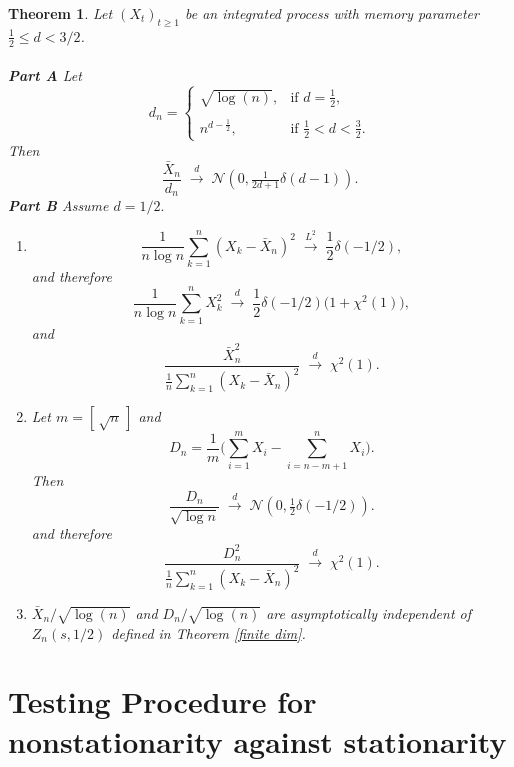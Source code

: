 \documentclass[12pt]{article}
\numberwithin{equation}{section}
\newtheorem{thm}{Theorem}[section]
\begin{document}
\begin{thm}\label{1 over f1}
Let $(X_t)_{t\ge1}$ be an integrated process with memory parameter $\tfrac12\le d<3/2$.\\\\
{\bf Part A}
Let
$$
d_n=\begin{cases}
    \sqrt{\log(n)},&\textrm{if }d=\frac{1}{2},\\\\n^{d-\frac{1}{2}},&\textrm{if }\frac{1}{2}<d<\frac{3}{2}.
\end{cases}
$$
Then
\[
\frac{\bar X_n}{d_n} \;\xrightarrow{d}\; \mathcal N\!\left(0,\tfrac1{2d+1}\delta(d-1)\right).
\]
{\bf Part B} Assume $d=1/2.$ 
\begin{enumerate}
\item
\[
\frac{1}{n\log n}\sum_{k=1}^n (X_k-\bar X_n)^2
\;\xrightarrow{L^2}\;
\frac12\delta(-1/2),
\]
and therefore
\[
\frac{1}{n\log n}\sum_{k=1}^n X_k^2
\;\xrightarrow{d}\;
\frac12\delta(-1/2)\bigl(1+\chi^2(1)\bigr),
\]
and 
$$
\frac{\bar X_n^2}{\frac{1}{n}\displaystyle\sum_{k=1}^n (X_k-\bar X_n)^2}
\;\xrightarrow{d}\;
\chi^2(1).
$$
\item Let $m=[\,\sqrt{n}\,]$ and
\[
D_n=\frac{1}{m}\Big(\sum_{i=1}^m X_i-\sum_{i=n-m+1}^n X_i\Big).
\]
Then
\[
\frac{D_n}{\sqrt{\log n}} \;\xrightarrow{d}\; \mathcal N\!\left(0,\tfrac12\delta(-1/2)\right).
\]
and therefore
\begin{equation}\label{sample mean ratio}
\frac{D_n^2}{\frac{1}{n}\displaystyle\sum_{k=1}^n (X_k-\bar X_n)^2}
\;\xrightarrow{d}\;
\chi^2(1).
\end{equation}
\item $\bar X_n/\sqrt{\log(n)}$ and $D_n/\sqrt{\log(n)}$ are asymptotically independent of $Z_n(s,1/2)$ defined in Theorem \ref{finite dim}.
\end{enumerate}
\end{thm}
\section{Testing Procedure for  nonstationarity against stationarity }\label{simulation}
\end{document}
